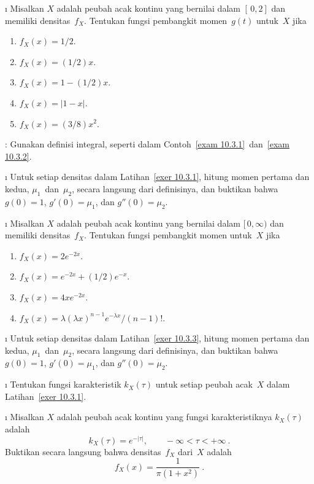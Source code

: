 \exercises
\begin{LJSItem}


\i\label{exer 10.3.1} Misalkan $X$ adalah peubah acak kontinu yang bernilai dalam
$[\,0,2]$ dan memiliki densitas~$f_X$.  Tentukan fungsi pembangkit momen~$g(t)$ untuk~$X$
jika
\begin{enumerate}
\item $f_X(x) = 1/2$.

\item $f_X(x) = (1/2)x$.

\item $f_X(x) = 1 - (1/2)x$.

\item $f_X(x) = |1 - x|$.

\item $f_X(x) = (3/8)x^2$.
\end{enumerate}
\noindent {}: Gunakan definisi integral, seperti dalam Contoh~\ref{exam
10.3.1}~dan~\ref{exam 10.3.2}.

\i\label{exer 10.3.2} Untuk setiap densitas dalam Latihan~\ref{exer 10.3.1}, hitung 
momen pertama dan kedua, $\mu_1$~dan~$\mu_2$, secara langsung dari definisinya, dan 
buktikan bahwa $g(0) = 1$, $g'(0) = \mu_1$, dan $g''(0) = \mu_2$.

\i\label{exer 10.3.3} Misalkan $X$ adalah peubah acak kontinu yang bernilai dalam
$[\,0,\infty)$ dan memiliki densitas~$f_X$.  Tentukan fungsi pembangkit momen untuk~$X$
jika
\begin{enumerate}
\item $f_X(x) = 2e^{-2x}$.

\item $f_X(x) = e^{-2x} + (1/2)e^{-x}$.

\item $f_X(x) = 4xe^{-2x}$.

\item $f_X(x) = \lambda(\lambda x)^{n - 1} e^{-\lambda x}/(n - 1)!$.
\end{enumerate}

\i\label{exer 10.3.4} Untuk setiap densitas dalam Latihan~\ref{exer 10.3.3}, hitung 
momen pertama dan kedua, $\mu_1$~dan~$\mu_2$, secara langsung dari definisinya, dan buktikan
bahwa $g(0) = 1$, $g'(0) = \mu_1$, dan $g''(0) = \mu_2$.

\i\label{exer 10.3.5} Tentukan fungsi karakteristik $k_X(\tau)$ untuk setiap peubah
acak~$X$ dalam Latihan~\ref{exer 10.3.1}.

\i\label{exer 10.3.6} Misalkan $X$ adalah peubah acak kontinu yang fungsi karakteristiknya
$k_X(\tau)$ adalah
$$
k_X(\tau) = e^{-|\tau|}, \qquad -\infty < \tau < +\infty\ .
$$
Buktikan secara langsung bahwa densitas~$f_X$ dari~$X$ adalah
$$
f_X(x) = \frac1{\pi(1 + x^2)}\ .
$$


\end{LJSItem}
